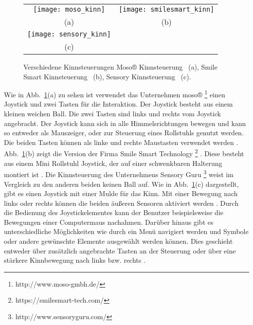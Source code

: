 \begin{figure}
\centering\small
\setlength{\tabcolsep}{0mm}	%
\begin{tabular}{c@{\hspace{15mm}}c} %
  \texttt{[image: moso\_kinn]} &
  \texttt{[image: smilesmart\_kinn]}
\\
  (a) & (b)
\\[5pt]	%
  \texttt{[image: sensory\_kinn]}
\\
  (c)
\end{tabular}
%
\caption{Verschiedene Kinnsteuerungen \newline
Moso® Kinnsteuerung \cite{MOSO}~(a), Smile Smart Kinnsteuerung \cite{SMILESMART}~(b), 
Sensory Kinnsteuerung \cite{SENSORY} ~(c).}
\label{fig:kinn}
\end{figure}
Wie in Abb.~\ref{fig:kinn}(a) zu sehen ist verwendet das Unternehmen moso® %
\footnote{http://www.moso-gmbh.de/}
%
einen Joystick und zwei Tasten für die Interaktion. Der Joystick besteht aus einem kleinen weichen Ball. Die zwei Tasten sind links und rechts vom Joystick angebracht. Der Joystick kann sich in alle Himmelsrichtungen bewegen und kann so entweder als Mauszeiger, oder zur Steuerung eines Rollstuhls genutzt werden. Die beiden Tasten können als linke und rechte Maustasten verwendet werden \cite{MOSO}.
\newline
Abb.~\ref{fig:kinn}(b) zeigt die Version der Firma Smile Smart Technology %
\footnote{https://smilesmart-tech.com/}
%
. Diese besteht aus einem Mini Rollstuhl Joystick, der auf einer schwenkbaren Halterung montiert ist \cite{SMILESMART}.
\newline
Die Kinnsteuerung des Unternehmens Sensory Guru %
\footnote{http://www.sensoryguru.com/}
%
weist im Vergleich zu den anderen beiden keinen Ball auf. Wie in Abb.~\ref{fig:kinn}(c) dargestellt, gibt es einen Joystick mit einer Mulde für das Kinn. Mit einer Bewegung nach links oder rechts können die beiden äußeren Sensoren aktiviert werden \cite{SENSORY}. 
\newline \newline
Durch die Bedienung des Joystickelementes kann der Benutzer beispielsweise die Bewegungen einer Computermaus nachahmen. Darüber hinaus gibt es unterschiedliche Möglichkeiten wie durch ein Menü navigiert werden und Symbole oder andere gewünschte Elemente ausgewählt werden können. Dies geschieht entweder über zusätzlich angebrachte Tasten an der Steuerung oder über eine stärkere Kinnbewegung nach links bzw. rechts \cite{MOSO} \cite{SENSORY}. 

